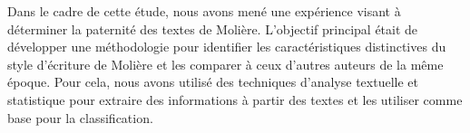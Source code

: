 \vspace{\baselineskip}
\hspace{0,5cm}Dans le cadre de cette étude, nous avons mené une expérience visant à déterminer
la paternité des textes de Molière. L'objectif principal était de développer une
méthodologie pour identifier les caractéristiques distinctives du style
d'écriture de Molière et les comparer à ceux d'autres auteurs de la même époque.
Pour cela, nous avons utilisé des techniques d'analyse textuelle et statistique
pour extraire des informations à partir des textes et les utiliser comme base
pour la classification.